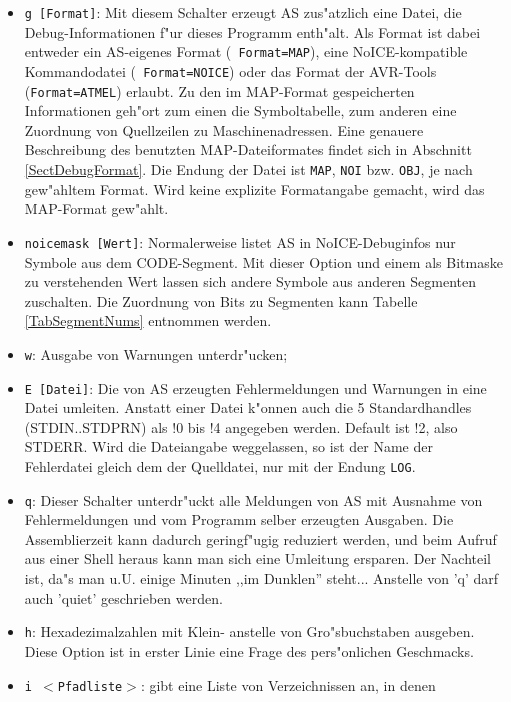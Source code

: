 \documentclass[12pt,a4paper,twoside]{report}
\newcommand{\tty}[1]{{\tt #1}}
\begin{document}
\begin{itemize}
\item{\tty{g [Format]}: Mit diesem Schalter erzeugt AS zus"atzlich eine
      Datei, die Debug-Informationen f"ur dieses Programm enth"alt.
      Als Format ist dabei entweder ein AS-eigenes Format ({\tt
      Format=MAP}), eine NoICE-kompatible Kommandodatei ({\tt
      Format=NOICE}) oder das Format der AVR-Tools ({\tt Format=ATMEL})
      erlaubt.  Zu den im MAP-Format gespeicherten
      Informationen geh"ort zum einen die Symboltabelle, zum anderen eine
      Zuordnung von Quellzeilen zu Maschinenadressen.  Eine genauere
      Beschreibung des benutzten MAP-Dateiformates findet sich in
      Abschnitt \ref{SectDebugFormat}.  Die Endung der Datei ist
      \tty{MAP}, \tty{NOI} bzw. \tty{OBJ}, je nach gew"ahltem Format.
      Wird keine explizite Formatangabe gemacht, wird das MAP-Format
      gew"ahlt.}
\item{\tty{noicemask [Wert]}: Normalerweise listet AS in NoICE-Debuginfos
      nur Symbole aus dem CODE-Segment.  Mit dieser Option und einem als
      Bitmaske zu verstehenden Wert lassen sich andere Symbole aus
      anderen Segmenten zuschalten.  Die Zuordnung von Bits zu Segmenten
      kann Tabelle \ref{TabSegmentNums} entnommen werden.} 
\item{\tty{w}: Ausgabe von Warnungen unterdr"ucken;}
\item{\tty{E [Datei]}: Die von AS erzeugten Fehlermeldungen und Warnungen
      in eine Datei umleiten.  Anstatt einer Datei k"onnen auch die 5
      Standardhandles (STDIN..STDPRN) als !0 bis !4 angegeben werden.
      Default ist !2, also STDERR. Wird die Dateiangabe weggelassen,
      so ist der Name der Fehlerdatei gleich dem der Quelldatei, nur
      mit der Endung \tty{LOG}.}
\item{\tty{q}: Dieser Schalter unterdr"uckt alle Meldungen von AS mit
      Ausnahme von Fehlermeldungen und vom Programm selber erzeugten
      Ausgaben.  Die Assemblierzeit kann dadurch geringf"ugig reduziert
      werden, und beim Aufruf aus einer Shell heraus kann man sich eine
      Umleitung ersparen.  Der Nachteil ist, da"s man u.U. einige Minuten
      ,,im Dunklen'' steht...  Anstelle von 'q' darf auch 'quiet' geschrieben
      werden.}
\item{\tty{h}: Hexadezimalzahlen mit Klein- anstelle von Gro"sbuchstaben ausgeben.
      Diese Option ist in erster Linie eine Frage des pers"onlichen
      Geschmacks.}
\item{\tty{i $<$Pfadliste$>$}: gibt eine Liste von Verzeichnissen an, in denen
}
\end{itemize}
\end{document}
